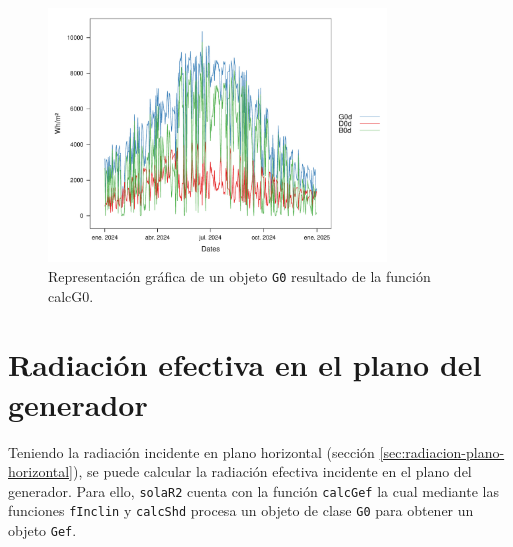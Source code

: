 \begin{itemize}
\begin{figure}[!htb]
\centering
\includegraphics[width=0.8\textwidth]{figuras/codigo-calcg0.pdf}
\caption{Representación gráfica de un objeto \texttt{G0} resultado de la función calcG0.}
\end{figure}
\end{itemize}

\section{Radiación efectiva en el plano del generador}
\label{sec:orgf3ff8a8}
\label{sec:radiacion-efectiva-plano-generador}
Teniendo la radiación incidente en plano horizontal (sección \ref{sec:radiacion-plano-horizontal}), se puede calcular la radiación efectiva incidente en el plano del generador. Para ello, \texttt{solaR2} cuenta con la función \texttt{calcGef} la cual mediante las funciones \texttt{fInclin} y \texttt{calcShd} procesa un objeto de clase \texttt{G0} para obtener un objeto \texttt{Gef}.


